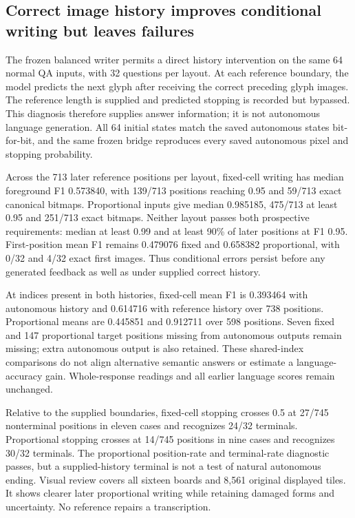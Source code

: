 \subsection*{Correct image history improves conditional writing but leaves failures}
The frozen balanced writer permits a direct history intervention on the same
64 normal QA inputs, with 32 questions per layout. At each reference boundary,
the model predicts the next glyph after receiving the correct preceding glyph
images. The reference length is supplied and predicted stopping is recorded
but bypassed. This diagnosis therefore supplies answer information; it is not
autonomous language generation. All 64 initial states match the saved autonomous
states bit-for-bit, and the same frozen bridge reproduces every saved autonomous
pixel and stopping probability.

Across the 713 later reference positions per layout, fixed-cell writing has
median foreground F1 0.573840, with 139/713 positions reaching 0.95 and 59/713
exact canonical bitmaps. Proportional inputs give median 0.985185, 475/713 at
least 0.95 and 251/713 exact bitmaps. Neither layout passes both prospective
requirements: median at least 0.99 and at least 90\% of later positions at F1
0.95. First-position mean F1 remains 0.479076 fixed and 0.658382 proportional,
with 0/32 and 4/32 exact first images. Thus conditional errors persist before
any generated feedback as well as under supplied correct history.

At indices present in both histories, fixed-cell mean F1 is 0.393464 with
autonomous history and 0.614716 with reference history over 738 positions.
Proportional means are 0.445851 and 0.912711 over 598 positions. Seven fixed and
147 proportional target positions missing from autonomous outputs remain
missing; extra autonomous output is also retained. These shared-index comparisons
do not align alternative semantic answers or estimate a language-accuracy gain.
Whole-response readings and all earlier language scores remain unchanged.

Relative to the supplied boundaries, fixed-cell stopping crosses 0.5 at 27/745
nonterminal positions in eleven cases and recognizes 24/32 terminals.
Proportional stopping crosses at 14/745 positions in nine cases and recognizes
30/32 terminals. The proportional position-rate and terminal-rate diagnostic
passes, but a supplied-history terminal is not a test of natural autonomous
ending. Visual review covers all sixteen boards and 8,561 original displayed
tiles. It shows clearer later proportional writing while retaining damaged
forms and uncertainty. No reference repairs a transcription.

